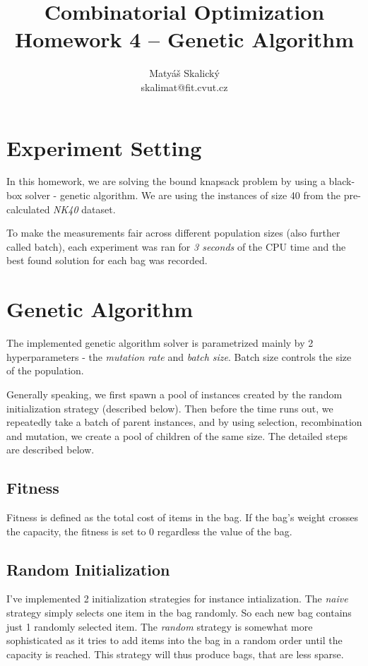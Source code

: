 \documentclass[a4paper,10pt]{article}
\title{Combinatorial Optimization\\Homework 4 – Genetic Algorithm}
\author{Matyáš Skalický\\skalimat@fit.cvut.cz}
\begin{document}
\maketitle
\tableofcontents
\medskip

\section{Experiment Setting}
In this homework, we are solving the bound knapsack problem by using a black-box solver - genetic algorithm. We are using the instances of size 40 from the pre-calculated \emph{NK40} dataset.

To make the measurements fair across different population sizes (also further called batch), each experiment was ran for \emph{3 seconds} of the CPU time and the best found solution for each bag was recorded.

\section{Genetic Algorithm}

The implemented genetic algorithm solver is parametrized mainly by 2 hyperparameters - the \emph{mutation rate} and \emph{batch size}. Batch size controls the size of the population.

Generally speaking, we first spawn a pool of instances created by the random initialization strategy (described below). Then before the time runs out, we repeatedly take a batch of parent instances, and by using selection, recombination and mutation, we create a pool of children of the same size. The detailed steps are described below.

\subsection{Fitness}

Fitness is defined as the total cost of items in the bag. If the bag's weight crosses the capacity, the fitness is set to $0$ regardless the value of the bag.

\subsection{Random Initialization}

I've implemented 2 initialization strategies for instance intialization. The \emph{naive} strategy simply selects one item in the bag randomly. So each new bag contains just 1 randomly selected item. The \emph{random} strategy is somewhat more sophisticated as it tries to add items into the bag in a random order until the capacity is reached. This strategy will thus produce bags, that are less sparse.
\end{document}

